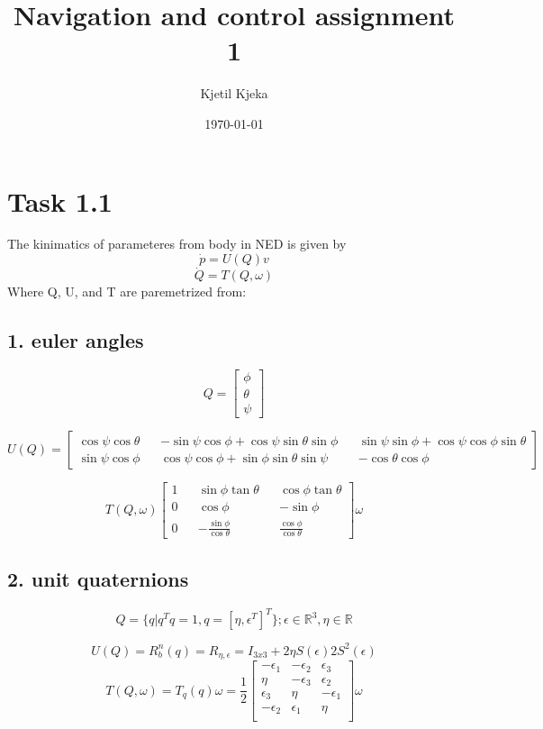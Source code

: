 \documentclass[11pt]{article}
\author{Kjetil Kjeka}
\date{\today}
\title{Navigation and control assignment 1}
\begin{document}
\maketitle
\section*{Task 1.1}
The kinimatics of parameteres from body in NED is given by 
\[ \dot{p} = U(Q) v \]
\[\dot{Q} = T(Q, \omega) \]
Where Q, U, and T are paremetrized from:
\subsection*{1. euler angles}
\[Q = 
\begin{bmatrix}
\phi \\ \theta \\ \psi
\end{bmatrix}
\]

\[ U(Q) = 
\begin{bmatrix}
\cos{\psi} \cos{\theta} && - \sin{\psi} \cos{\phi} + \cos{\psi} \sin{\theta} \sin{\phi} && \sin{\psi} \sin{\phi} + \cos{\psi} \cos{\phi} \sin{\theta} \\
\sin{\psi} \cos{\phi} && \cos{\psi} \cos{\phi} + \sin{\phi} \sin{\theta} \sin{\psi} && - \cos{\theta} \cos{\phi}
\end{bmatrix}
\]

\[ T(Q, \omega)
\begin{bmatrix}
\displaystyle
1 && \sin{\phi} \tan{\theta} && \cos{\phi} \tan{\theta} \\
0 && \cos{\phi} && - \sin{\phi} \\
0 && - \frac{ \sin{\phi} }{ \cos{\theta} } && \frac{ \cos{\phi} }{ \cos{\theta} }
\end{bmatrix} \omega
\]

\subsection*{2. unit quaternions}
\[Q = \{q|q^Tq = 1, q = [\eta,\epsilon^T]^T\};\epsilon \in \mathbb{R}^3, \eta \in \mathbb{R} \]

\[U(Q) = R_b^n(q) = R_{\eta,\epsilon} = I_{3x3} + 2\eta S(\epsilon) 2S^2(\epsilon) \]
\[ T(Q,\omega) = T_q(q)\omega = 
\frac{1}{2}
 \begin{bmatrix}
   -\epsilon_1 & -\epsilon_2 & \epsilon_3 \\
   \eta & -\epsilon_3 & \epsilon_2 \\
   \epsilon_3 & \eta & -\epsilon_1 \\
   -\epsilon_2 & \epsilon_1 & \eta \\
 \end{bmatrix}
 \omega
\]
\end{document}

